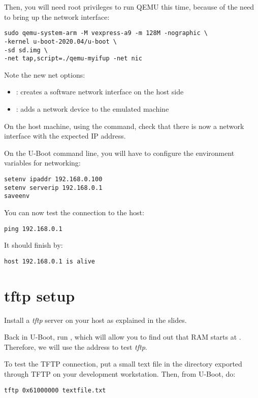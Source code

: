 Then, you will need root privileges to run QEMU this time,
because of the need to bring up the network interface:

\begin{verbatim}
sudo qemu-system-arm -M vexpress-a9 -m 128M -nographic \
-kernel u-boot-2020.04/u-boot \
-sd sd.img \
-net tap,script=./qemu-myifup -net nic
\end{verbatim}

Note the new net options:
\begin{itemize}
\item {}: creates a software network interface on the host side
\item \code{-net nic}: adds a network device to the emulated machine
\end{itemize}

On the host machine, using the \code{ip a} command, check that
there is now a  network interface with the expected IP
address.

On the U-Boot command line, you will have to configure the environment
variables for networking:

\begin{verbatim}
setenv ipaddr 192.168.0.100
setenv serverip 192.168.0.1
saveenv
\end{verbatim}

You can now test the connection to the host:
\begin{verbatim}
ping 192.168.0.1
\end{verbatim}

It should finish by:
\begin{verbatim}
host 192.168.0.1 is alive
\end{verbatim}

\section{tftp setup}

Install a {\em tftp} server on your host as explained in the slides.

Back in U-Boot, run , which will allow you to find out that
RAM starts at \code{0x60000000}. Therefore, we will use the 
address to test {\em tftp}.

To test the TFTP connection, put a small text file in
the directory exported through TFTP on your development
workstation. Then, from U-Boot, do:

\begin{verbatim}
tftp 0x61000000 textfile.txt
\end{verbatim}

